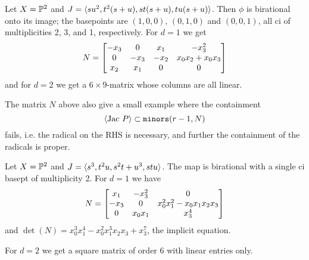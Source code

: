 \documentclass[fleqn,reqno]{amsart}
\numberwithin{first}{chapter}
\begin{document}



\begin{example}[$\mt{ex210}$]
\label{ex210}
Let $X=\mathbb{P}^2$ and $J=\langle su^2,t^2(s+u),st(s+u),tu(s+u)\rangle$. Then $\phi$ is birational onto its
image; the basepoints are $(1,0,0)$, $(0,1,0)$ and $(0,0,1)$,
all ci of multiplicities 2, 3, and 1, respectively. For $d=1$ we get
\[
N=\bgroup\begin{bmatrix}{-{x}_{3}}&
0&
{x}_{1}&
{-{x}_{3}^{2}}\\
0&
{-{x}_{3}}&
{-{x}_{2}}&
{x}_{0} {x}_{2}+{x}_{0} {x}_{3}\\
{x}_{2}&
{x}_{1}&
0&
0\\
\end{bmatrix}\egroup
\]
and for $d=2$ we get a $6\times 9$-matrix whose columns are all linear.

The matrix $N$ above also give a small example where the containment
\[
\langle\text{Jac}~P\rangle\subset\mathop{\tt minors}(r-1,N)
\]
fails, i.e. the radical on the RHS is necessary, and further the containment of the
radicals is proper.
\end{example}

\begin{example}[$\mt{ex211}$]
Let $X=\mathbb{P}^2$ and $J=\langle s^3,t^2u,s^2t+u^3,stu\rangle$. The map is birational
with a single ci basept of multiplicity 2. For $d=1$ we have
\label{ex211}
\[
	N=\bgroup\begin{bmatrix}{x}_{1}&
  {-{x}_{3}^{2}}&
  0\\
  {-{x}_{3}}&
  0&
  {x}_{0}^{2} {x}_{1}^{2}-{x}_{0} {x}_{1} {x}_{2} {x}_{3}\\
  0&
  {x}_{0} {x}_{1}&
  {x}_{3}^{4}\\
  \end{bmatrix}\egroup
\]
and $\det(N)={x}_{0}^{3} {x}_{1}^{4}-{x}_{0}^{2} {x}_{1}^{3} {x}_{2} {x}_{3}+{x}_{3}^{7}$,
the implicit equation.

For $d=2$ we get a square matrix of order $6$ with linear entries only.
\end{example}
\end{document}
